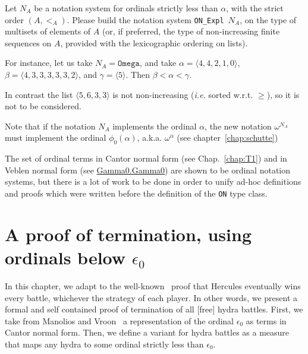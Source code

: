 \begin{project}
Let $N_A$ be a notation system for ordinals strictly less than $\alpha$, 
with the strict order $(A,<_A)$. Please build the notation system
\texttt{ON\_Expl $N_A$}, on the type of multisets of elements of $A$
(or, if preferred, the type of non-increasing finite sequences on $A$,
provided with the lexicographic ordering on lists).

For instance, let us take $N_A=\texttt{Omega}$, and take $\alpha=\langle 4,4,2,1,0\rangle$,
 $\beta=\langle 4,3,3,3,3,3,2\rangle$, and $\gamma=\langle 5\rangle$. Then $\beta<\alpha<\gamma$. 

In contrast the list $\langle5,6,3,3\rangle$ is not non-increasing (\emph{i.e.} sorted w.r.t. $\geq$), so it is not to be considered.

Note that if the notation $N_A$ implements the ordinal 
$\alpha$,  the new notation $\omega^{N_A}$ must implement the ordinal $\phi_0(\alpha)$, a.k.a. $\omega^\alpha$ (see chapter~\ref{chap:schutte})

\end{project}



\begin{remark}
 The set of ordinal terms in Cantor normal form (see Chap.~\ref{chap:T1}) and 
in Veblen normal form (see 
\href{../theories/html/hydras.Gamma0.Gamma0.html}{Gamma0.Gamma0}) are shown to be ordinal notation systems, but there is a lot of work to be done in order to unify ad-hoc  definitions and proofs which were written before the definition of the \texttt{ON} type class.
\end{remark}











\chapter[A proof of termination, using epsilon0]{A proof of termination, using ordinals below \texorpdfstring{$\epsilon_0$}{Epsilon0}}

\label{cnf-math-def}
\label{chap:T1}

In this chapter, we adapt to \coq{} the well-known~\cite{KP82}  proof that Hercules eventually wins every battle, whichever the strategy  of each player.
In other words, we present  a formal and self contained proof of termination  of all [free] hydra battles.
First, we take from Manolios and Vroon~\cite{Manolios2005} a representation of the ordinal $\epsilon_0$ as terms in Cantor normal form. Then, we define a variant for hydra battles as a measure that maps any hydra to some ordinal strictly less than $\epsilon_0$.



